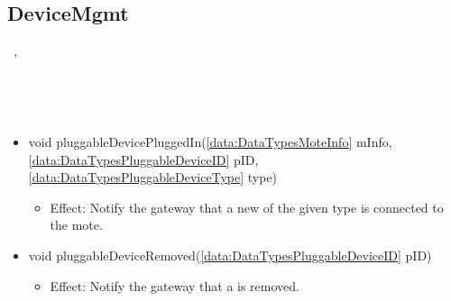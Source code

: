   \subsection{DeviceMgmt}\label{int:GatewayGatewayDeviceManagerDeviceMgmt}
    \begin{description}
      \item[Provided by:] \iconcomponent{}~, \iconcomponent{}~
      \item[Required by:] \iconcomponent{}~
      \item[Operations:] ~
    \begin{itemize}[noitemsep,nolistsep,leftmargin=-.25cm]
      \item \textsf{void pluggableDevicePluggedIn(\ref{data:DataTypesMoteInfo} mInfo, \ref{data:DataTypesPluggableDeviceID} pID, \ref{data:DataTypesPluggableDeviceType} type)}
        \begin{itemize}[noitemsep,nolistsep]
           \item Effect: Notify the gateway that a new  of the given type is connected
to the mote.
        \end{itemize}
      \item \textsf{void pluggableDeviceRemoved(\ref{data:DataTypesPluggableDeviceID} pID)}
        \begin{itemize}[noitemsep,nolistsep]
           \item Effect: Notify the gateway that a  is removed.
        \end{itemize}
    \end{itemize}
    \end{description}

